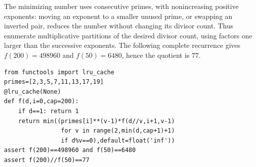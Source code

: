 The minimizing number uses consecutive primes, with nonincreasing positive exponents: moving an exponent to a smaller unused prime, or swapping an inverted pair, reduces the number without changing its divisor count. Thus enumerate multiplicative partitions of the desired divisor count, using factors one larger than the successive exponents. The following complete recurrence gives $f(200)=498960$ and $f(50)=6480$, hence the quotient is $\boxed{77}$.
\begin{verbatim}
from functools import lru_cache
primes=[2,3,5,7,11,13,17,19]
@lru_cache(None)
def f(d,i=0,cap=200):
    if d==1: return 1
    return min((primes[i]**(v-1)*f(d//v,i+1,v-1)
                for v in range(2,min(d,cap+1)+1)
                if d%v==0),default=float('inf'))
assert f(200)==498960 and f(50)==6480
assert f(200)//f(50)==77
\end{verbatim}
